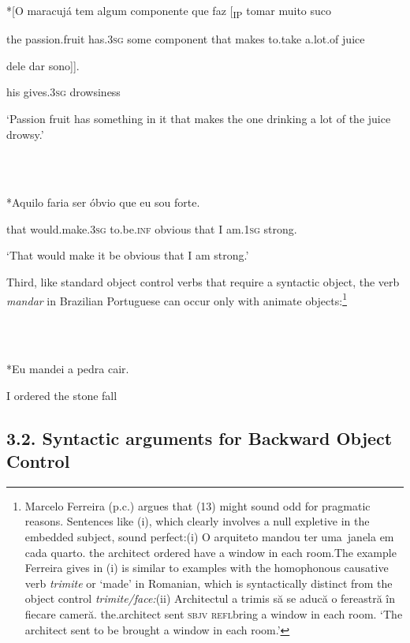 \documentclass[output=paper]{langsci/langscibook}
\begin{document}
          *[O maracujá      tem       algum componente que faz     [\textsubscript{IP} tomar  muito   suco 

  the  passion.fruit has.3\textsc{sg} some  component   that makes    to.take a.lot.of juice 

dele dar            sono]].

   his   gives.3\textsc{sg} drowsiness

  ‘Passion fruit has something in it that makes the one drinking a lot of the juice     drowsy.’ \citep[119]{Farrell1995}

\ea%
    \label{ex:moreno:12}
    \gll\\
        \\
    \glt
    \z

          *Aquilo faria                ser           óbvio    que eu sou        forte.

  that        would.make.3\textsc{sg}   to.be.\textsc{inf} obvious that  I  am.\textsc{1sg} strong.

  ‘That would make it be obvious that I am strong.’ \citep[120]{Farrell1995}

Third, like standard object control verbs that require a syntactic object, the verb \textit{mandar} in Brazilian Portuguese can occur only with animate objects:\footnote{Marcelo Ferreira (p.c.) argues that (13) might sound odd for pragmatic reasons. Sentences like (i), which clearly involves a null expletive in the~ embedded subject, sound perfect:(i)  O   arquiteto mandou   ter    uma~janela    em cada quarto.  the architect  ordered   have a      window in  each  room.The example Ferreira gives in (i) is similar to examples with the homophonous causative verb \textit{trimite} or ‘made’ in Romanian, which is syntactically distinct from the object control \textit{trimite/face:}(ii)    Architectul   a trimis să     se    aducă o fereastră în fiecare cameră.  the.architect sent       \textsc{sbjv refl}bring a window   in each    room.  ‘The architect sent to be brought a window in each room.’}

\ea%
    \label{ex:moreno:13}
    \gll\\
        \\
    \glt
    \z

          *Eu  mandei  a   pedra cair.

    I      ordered the stone fall

\subsection{ 3.2. Syntactic arguments for Backward Object Control} 
\end{document}

